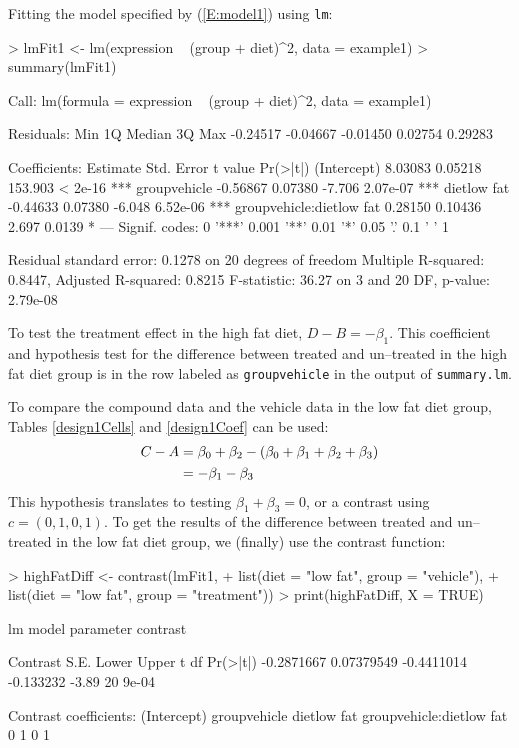 \documentclass[12pt]{article}
\newcommand{\code}[1]{\mbox{\footnotesize\color{darkblue}\texttt{#1}}}
\renewenvironment{Schunk}{\vspace{\topsep}}{\vspace{\topsep}}
\begin{document}
Fitting the model specified by  (\ref{E:model1}) using \code{lm}:
\begin{Schunk}
\begin{Sinput}
> lmFit1 <- lm(expression ~ (group + diet)^2, data = example1)
> summary(lmFit1)
\end{Sinput}
\begin{Soutput}
Call:
lm(formula = expression ~ (group + diet)^2, data = example1)

Residuals:
     Min       1Q   Median       3Q      Max 
-0.24517 -0.04667 -0.01450  0.02754  0.29283 

Coefficients:
                         Estimate Std. Error t value Pr(>|t|)    
(Intercept)               8.03083    0.05218 153.903  < 2e-16 ***
groupvehicle             -0.56867    0.07380  -7.706 2.07e-07 ***
dietlow fat              -0.44633    0.07380  -6.048 6.52e-06 ***
groupvehicle:dietlow fat  0.28150    0.10436   2.697   0.0139 *  
---
Signif. codes:  0 '***' 0.001 '**' 0.01 '*' 0.05 '.' 0.1 ' ' 1 

Residual standard error: 0.1278 on 20 degrees of freedom
Multiple R-squared: 0.8447,	Adjusted R-squared: 0.8215 
F-statistic: 36.27 on 3 and 20 DF,  p-value: 2.79e-08 
\end{Soutput}
\end{Schunk}


To test the treatment effect in the high fat diet, $D-B = -\beta_1$. This coefficient and hypothesis test for the difference between treated and un--treated in the high fat diet group is in the row labeled as \code{groupvehicle} in the output of \code{summary.lm}. 


To compare the compound data and the vehicle data in the low fat diet group, Tables \ref{design1Cells} and \ref{design1Coef} can be used:
\begin{align}
C - A &= 	\beta_0 + \beta_2 -(\beta_0+\beta_1+\beta_2+\beta_{3}) \notag \\
	&= -\beta_1 - \beta_{3} \notag
\end{align}
This hypothesis translates to testing $\beta_1 + \beta_{3} = 0$, or a contrast using $c=(0, 1, 0, 1)$. To get the results of the difference between treated and un--treated in the low fat diet group, we (finally) use the contrast function:
\begin{Schunk}
\begin{Sinput}
> highFatDiff <- contrast(lmFit1, 
+                         list(diet = "low fat", group = "vehicle"),
+                         list(diet = "low fat", group = "treatment"))
> print(highFatDiff, X = TRUE)
\end{Sinput}
\begin{Soutput}
lm model parameter contrast

   Contrast       S.E.      Lower     Upper     t df Pr(>|t|)
 -0.2871667 0.07379549 -0.4411014 -0.133232 -3.89 20    9e-04

Contrast coefficients:
 (Intercept) groupvehicle dietlow fat groupvehicle:dietlow fat
           0            1           0                        1
\end{Soutput}
\end{Schunk}
\end{document}
